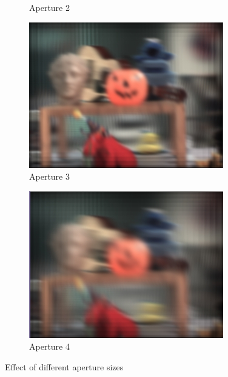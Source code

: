 \documentclass{article}
\begin{document}
\begin{figure}[htbp]
\begin{subfigure}[b]{0.24\textwidth}
        \caption{Aperture 2} %
    \end{subfigure}
    \hfill
    \begin{subfigure}[b]{0.24\textwidth} %
        \centering
        \includegraphics[width=\textwidth]{ap=2.png} %
        \caption{Aperture 3} %
    \end{subfigure}
    \hfill
    \centering
    \begin{subfigure}[b]{0.24\textwidth} %
        \centering
        \includegraphics[width=\textwidth]{ap=4.png} %
        \caption{Aperture 4} %
    \end{subfigure}

    \caption{Effect of different aperture sizes} %
    \label{fig:aperture_example}
\end{figure}
\end{document}

